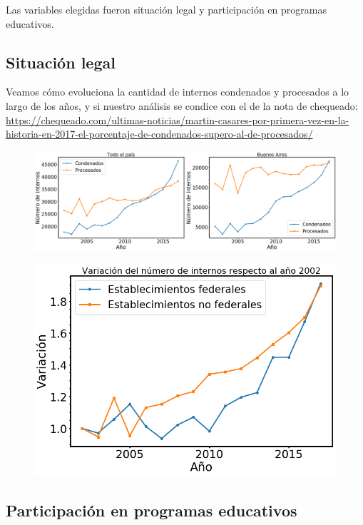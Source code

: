\documentclass[10pt]{article}
\begin{document}
Las variables elegidas fueron situación legal y participación en programas educativos.

\subsection{Situación legal}

Veamos cómo evoluciona la cantidad de internos condenados y procesados a lo largo de los años, y si nuestro análisis se condice con el de la nota de chequeado: \url{https://chequeado.com/ultimas-noticias/martin-casares-por-primera-vez-en-la-historia-en-2017-el-porcentaje-de-condenados-supero-al-de-procesados/}

\begin{figure}[H]
	\centering
	\includegraphics[scale=0.28]{graficos/situacion.png}
	\caption{}
\end{figure}

\begin{figure}[H]
	\centering
	\includegraphics[scale=0.3]{graficos/variacion.png}
	\caption{}
\end{figure}

\subsection{Participación en programas educativos}
\end{document}
